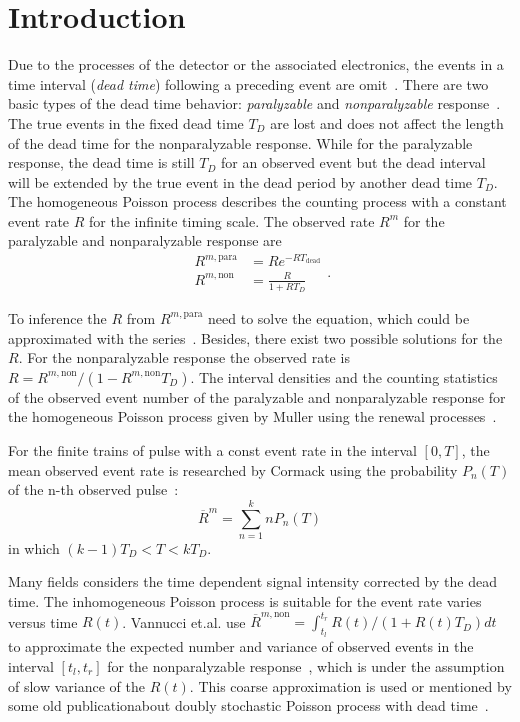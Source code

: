 \section{Introduction}

Due to the processes of the detector or the associated electronics, the events in a time interval (\textit{dead time}) following a preceding event are omit~\cite{Knoll:2000fj}. There are two basic types of the dead time behavior: \textit{paralyzable} and \textit{nonparalyzable} response~\cite{müller1973deadtime,muller:1994,Knoll:2000fj}. The true events in the fixed dead time $T_D$ are lost and does not affect the length of the dead time for the nonparalyzable response. While for the paralyzable response, the dead time is still $T_D$ for an observed event but the dead interval will be extended by the true event in the dead period by another dead time $T_D$. The homogeneous Poisson process describes the counting process with a constant event rate $R$ for the infinite timing scale. The observed rate $R^m$ for the paralyzable and nonparalyzable response are~\cite{muller:1994}
\begin{equation}
\begin{aligned}
	R^{m,\mathrm{para}}&=Re^{-RT_\mathrm{dead}}\\
	R^{m,\mathrm{non}}&=\frac{R}{1+RT_D}
\end{aligned}.
\end{equation}

To inference the $R$ from $R^{m,\mathrm{para}}$ need to solve the equation, which could be approximated with the series~\cite{muller:1994}. Besides, there exist two possible solutions for the $R$. For the nonparalyzable response the observed rate is $R=R^{m,\mathrm{non}}/(1-R^{m,\mathrm{non}}T_D)$. The interval densities and the counting statistics of the observed event number of the paralyzable and nonparalyzable response for the homogeneous Poisson process given by Muller using the renewal processes~\cite{müller1973deadtime,muller:1994,yu:2000mean,pomme:2015uncertainty}.

For the finite trains of pulse with a const event rate in the interval $[0,T]$, the mean observed event rate is researched by Cormack using the probability $P_n(T)$ of the n-th observed pulse~\cite{Cormack:1962}:
\begin{equation}
\overline{R}^m=\sum_{n=1}^{k}{nP_n(T)}
\end{equation}
in which $(k-1)T_D<T<kT_D$.

Many fields considers the time dependent signal intensity corrected by the dead time. The inhomogeneous Poisson process is suitable for the event rate varies versus time $R(t)$. Vannucci et.al. use $\overline{R}^{m,\mathrm{non}}=\int_{t_l}^{t_r}{R(t)/\left(1+R(t)T_D\right)dt}$ to approximate the expected number and variance of observed events in the interval $[t_l,t_r]$ for the nonparalyzable response~\cite{Vannucci:1978,Vannucci:1981}, which is under the assumption of slow variance of the $R(t)$. This coarse approximation is used or mentioned by some old publicationabout doubly stochastic Poisson process with dead time~\cite{Saleh:1981,Teich:2000}.

